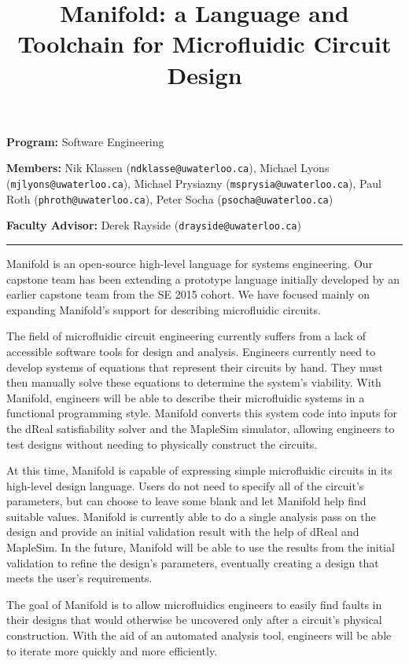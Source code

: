 \documentclass[12pt]{article}
\title{Manifold: a Language and Toolchain for Microfluidic Circuit Design}
\author{}
\date{\vspace{-10ex}}
\begin{document}
\maketitle

{\bf Program:} Software Engineering

{\bf Members:} Nik Klassen ({\tt ndklasse@uwaterloo.ca}), Michael Lyons ({\tt mjlyons@uwaterloo.ca}), Michael Prysiazny ({\tt msprysia@uwaterloo.ca}), Paul Roth ({\tt phroth@uwaterloo.ca}), Peter Socha ({\tt psocha@uwaterloo.ca})

{\bf Faculty Advisor:} Derek Rayside ({\tt drayside@uwaterloo.ca})

\rule{\textwidth}{1pt}



Manifold is an open-source high-level language for systems engineering.
Our capstone team has been extending a prototype language initially developed by an earlier capstone team from the SE 2015 cohort.
We have focused mainly on expanding Manifold's support for describing microfluidic circuits.

The field of microfluidic circuit engineering currently suffers from a lack of accessible software tools for design and analysis.
Engineers currently need to develop systems of equations that represent their circuits by hand.
They must then manually solve these equations to determine the system's viability.
With Manifold, engineers will be able to describe their microfluidic systems in a functional programming style.
Manifold converts this system code into inputs for the dReal satisfiability solver and the MapleSim simulator, allowing engineers to test designs without needing to physically construct the circuits.


At this time, Manifold is capable of expressing simple microfluidic circuits in its high-level design language.
Users do not need to specify all of the circuit's parameters, but can choose to leave some blank and let Manifold help find suitable values.
Manifold is currently able to do a single analysis pass on the design and provide an initial validation result with the help of dReal and MapleSim.
In the future, Manifold will be able to use the results from the initial validation to refine the design's parameters, eventually creating a design that meets the user's requirements.

The goal of Manifold is to allow microfluidics engineers to easily find faults in their designs that would otherwise be uncovered only after a circuit's physical construction.
With the aid of an automated analysis tool, engineers will be able to iterate more quickly and more efficiently.
\end{document}
